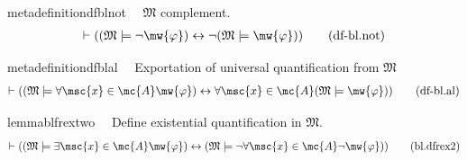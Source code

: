 \begin{restatable}{metadefinition}{dfblnot}~~ $\mathfrak{M}$ complement.
\begin{align}
\vdash ( ( \mathfrak{M} \models \lnot \mw{\varphi} ) \leftrightarrow \lnot (
    \mathfrak{M} \models \mw{\varphi} ) )\label{eq:df-bl.not}\tag{df-bl.not}
\end{align}
\end{restatable}

\begin{restatable}{metadefinition}{dfblal}~~ Exportation of universal quantification
from $\mathfrak{M}$
\begin{align}
\vdash ( ( \mathfrak{M} \models \forall \msc{x} \in \mc{A} \mw{\varphi} )
    \leftrightarrow \forall \msc{x} \in \mc{A} ( \mathfrak{M} \models
    \mw{\varphi} ) )\label{eq:df-bl.al}\tag{df-bl.al}
\end{align}
\end{restatable}

\begin{restatable}{lemma}{blfrextwo}~~ Define existential quantification in
$\mathfrak{M}$.
\begin{align}
\vdash ( ( \mathfrak{M} \models \exists \msc{x} \in \mc{A} \mw{\varphi} )
    \leftrightarrow ( \mathfrak{M} \models \lnot \forall \msc{x} \in \mc{A}
    \lnot \mw{\varphi} ) )\label{eq:bl.dfrex2}\tag{bl.dfrex2}
\end{align}
\end{restatable}

